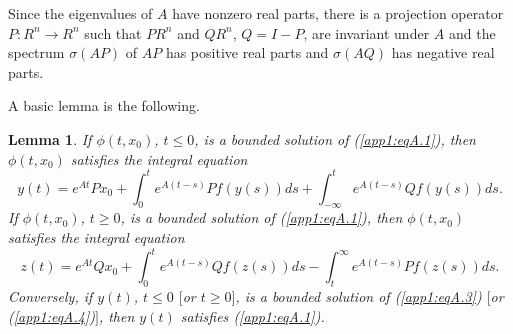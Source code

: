 \documentclass{surv-l}
\theoremstyle{plain}
\newtheorem{lemma}[theorem]{Lemma}
\theoremstyle{definition}
\numberwithin{equation}{section}
\numberwithin{figure}{chapter}
\begin{document}
Since the eigenvalues of $A$ have nonzero real parts, there is a projection operator $P:R^{n}\rightarrow R^{n}$ such that $PR^{n}$ and $QR^{n}$, $Q=I-P$, are invariant under $A$ and the spectrum $\sigma(AP)$ of $AP$ has positive real parts and $\sigma(AQ)$ has negative real parts.

A basic lemma is the following.
\renewcommand\thetheorem{A.\arabic{theorem}}
\setcounter{theorem}{0}
\begin{lemma}\label{app1:lemA.1}
If $\phi(t,x_{0})$, $t\leq 0$, is a bounded solution of \emph{(\ref{app1:eqA.1})}, then $\phi(t,x_{0})$ satisfies the integral equation
\begin{equation}\label{app1:eqA.3}
y(t)=e^{At}Px_{0}+\int_{0}^{t}e^{A(t-s)}Pf(y(s))ds+\int_{-\infty}^{t}e^{A(t-s)}Qf(y(s)) ds.
\end{equation}
If $\phi(t,x_{0})$, $t\geq 0$, is a bounded solution of \emph{(\ref{app1:eqA.1})}, then $\phi(t,x_{0})$ satisfies the integral equation
\begin{equation}\label{app1:eqA.4}
z(t)=e^{At}Qx_{0}+\int_{0}^{t}e^{A(t-s)}Qf(z(s))ds-\int_{t}^{\infty}e^{A(t-s)}Pf(z(s))ds.
\end{equation}
Conversely, if $y(t)$, $t\leq 0$ $[$or $t\geq 0]$, is a bounded solution of \emph{(\ref{app1:eqA.3})} $[$or \emph{(\ref{app1:eqA.4})}$]$, then $y(t)$ satisfies \emph{(\ref{app1:eqA.1})}.
\end{lemma}
\end{document}

